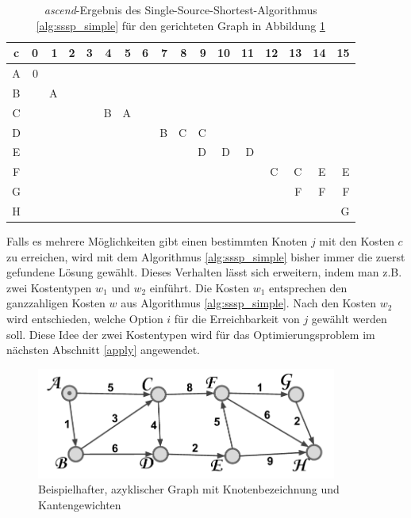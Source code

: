\documentclass[12pt]{article}
\begin{document}
\begin{table}
\begin{tabular}{c|r|r|r|r|r|r|r|r|r|r|r|r|r|r|r|r}
c&0&1&2&3&4&5&6&7&8&9&10&11&12&13&14&15\\ \hline
A&0& & & & & & & & & & & & & & &\\
B& &A& & & & & & & & & & & & & &\\
C& & & & &B&A& & & & & & & & & &\\
D& & & & & & & &B&C&C& & & & & &\\
E& & & & & & & & & &D&D&D& & & &\\
F& & & & & & & & & & & & &C&C&E&E\\
G& & & & & & & & & & & & & &F&F&F\\
H& & & & & & & & & & & & & & & &G\\
\end{tabular}
\caption{\textit{ascend}-Ergebnis des Single-Source-Shortest-Algorithmus \ref{alg:sssp_simple} für den gerichteten Graph in Abbildung \ref{pic:azyk_graph} }
\label{tab:sssp_result}
\end{table}

Falls es mehrere Möglichkeiten gibt einen bestimmten Knoten $j$ mit den Kosten $c$ zu erreichen, wird mit dem Algorithmus \ref{alg:sssp_simple} bisher immer die zuerst gefundene Lösung gewählt. Dieses Verhalten lässt sich erweitern, indem man z.B. zwei Kostentypen $w_{1}$ und $w_{2}$ einführt. Die Kosten $w_{1}$ entsprechen den ganzzahligen Kosten $w$ aus Algorithmus \ref{alg:sssp_simple}. Nach den Kosten $w_{2}$ wird entschieden, welche Option $i$ für die Erreichbarkeit von $j$ gewählt werden soll. Diese Idee der zwei Kostentypen wird für das Optimierungsproblem im nächsten Abschnitt \ref{apply} angewendet.

\begin{figure}[ht]
	\begin{center}
	\includegraphics[width=280pt]{pics/pdf/004_Azyklischer_Graph.pdf}
	\caption{Beispielhafter, azyklischer Graph mit Knotenbezeichnung und Kantengewichten}
	\label{pic:azyk_graph}
	\end{center}
\end{figure}
\pagebreak
\end{document}
